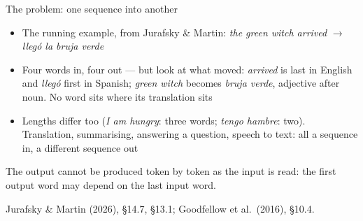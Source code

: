 \documentclass[aspectratio=169, 11pt]{beamer}
\newcommand{\srcline}[1]{%
  \par\vspace{0.25em}%
  {\scriptsize\color{mcMuted}\hfill #1\par}}
\begin{document}
\begin{frame}{The problem: one sequence into another}
  \vspace{0.05em}
  {\footnotesize
  \begin{itemize}\itemsep0.25em
    \item The running example, from Jurafsky \& Martin:
          \emph{the green witch arrived} $\longrightarrow$ \emph{lleg\'o la bruja verde}
    \item Four words in, four out --- but look at what moved: \emph{arrived}
          is last in English and \emph{lleg\'o} \alert{first} in Spanish;
          \emph{green witch} becomes \emph{bruja verde}, adjective after
          noun. No word sits where its translation sits
    \item Lengths differ too (\emph{I am hungry}: three words; \emph{tengo
          hambre}: two). Translation, summarising, answering a question,
          speech to text: all \alert{a sequence in, a different sequence out}
  \end{itemize}}
  \vspace{0.1em}
  \begin{redhighlight}
    The output cannot be produced token by token as the input is read:
    the first output word may depend on the last input word.
  \end{redhighlight}
  \srcline{Jurafsky \& Martin (2026), \S14.7, \S13.1; Goodfellow et al.\ (2016), \S10.4.}
\end{frame}
\end{document}
